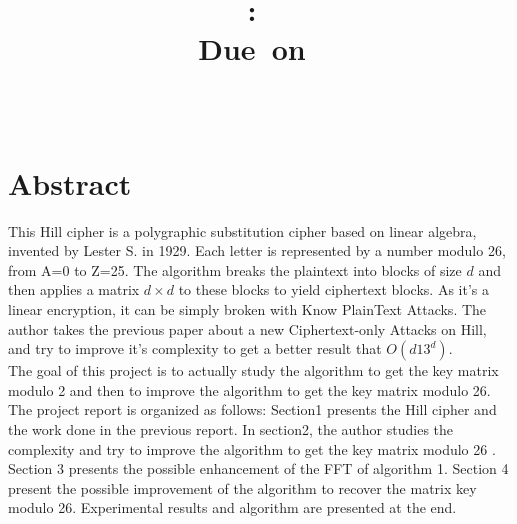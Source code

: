 \documentclass{article}
\title{
\vspace{2in}
\textmd{\textbf{\hmwkClass:\ \hmwkTitle}}\\
\normalsize\vspace{0.1in}\small{Due\ on\ \hmwkDueDate}\\
\vspace{0.1in}\large{\textit{\hmwkClassInstructor\ \hmwkClassTime}}
\vspace{3in}
}
\author{\textbf{\hmwkAuthorName}}
\date{} %
\begin{document}
\maketitle


\newpage
\section{Abstract}
This Hill cipher is a polygraphic substitution cipher based on linear algebra, invented by 
Lester S. in 1929. Each letter is represented by a number modulo 26, from A=0 to Z=25. The algorithm breaks the plaintext into blocks of size $d$ and then applies a matrix $d \times d $ to these blocks to yield ciphertext blocks. As it's a linear encryption, it can be simply broken with Know PlainText Attacks.
The author takes the previous paper about a new Ciphertext-only Attacks on Hill, and try to improve it's complexity to get a better result that $O(d13^d)$.\\
${}$\hspace{1em}The goal of this project is to actually study the algorithm to get the key matrix modulo 2 and then to improve the algorithm to get the key matrix modulo 26.\\
${}$\hspace{1em}The project report is organized as follows: Section1 presents the Hill cipher and the work done in the previous report. In section2, the author studies the complexity and try to improve the algorithm to get the key matrix modulo 26 . Section 3 presents the possible enhancement of the FFT of algorithm 1. Section 4 present the possible improvement of the algorithm to recover the matrix key modulo 26. Experimental results and algorithm are presented at the end.



\newpage
\tableofcontents
\newpage


\end{document}
